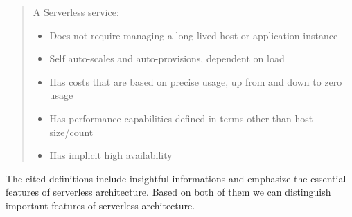 \begin{quotation}
    \noindent A Serverless service:
    \begin{itemize}
        \item Does not require managing a long-lived host or application instance
        \item Self auto-scales and auto-provisions, dependent on load
        \item Has costs that are based on precise usage, up from and down to zero usage
        \item Has performance capabilities defined in terms other than host size/count
        \item Has implicit high availability
    \end{itemize}        
\end{quotation}

The cited definitions include insightful informations and emphasize the essential features of serverless architecture. Based on both of them we can distinguish important features of serverless architecture.

